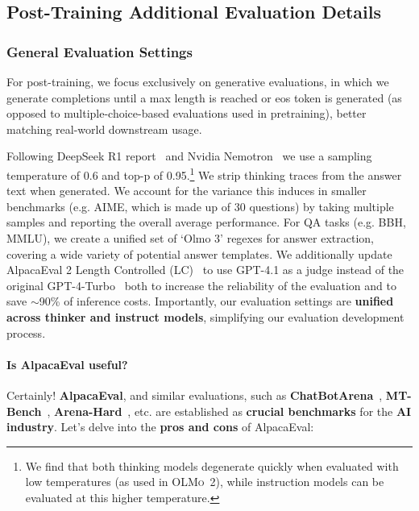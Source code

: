 \documentclass[table]{ai2style/ai2}
\newcommand{\oldOlmo}{OLMo\xspace}
\newcommand{\olmotoo}{\textsc{\oldOlmo~2}\xspace}
\begin{document}
{{\subsection{Post-Training Additional Evaluation Details}
\label{appx:eval-details}
\subsubsection{General Evaluation Settings}
\label{appx:eval-fun}

For post-training, we focus exclusively on generative evaluations, in which we generate completions until a max length is reached or eos token is generated (as opposed to multiple-choice-based evaluations used in pretraining), better matching real-world downstream usage.

Following DeepSeek R1 report~\citep{guo2025deepseek} and Nvidia Nemotron~\citep{adler2024nemotron} we use a sampling temperature of 0.6 and top-p of 0.95.\footnote{We find that both thinking models degenerate quickly when evaluated with low temperatures (as used in \olmotoo), while instruction models can be evaluated at this higher temperature.} We strip thinking traces from the answer text when generated.
We account for the variance this induces in smaller benchmarks (e.g. AIME, which is made up of 30 questions) by taking multiple samples and reporting the overall average performance.
For QA tasks (e.g. BBH, MMLU), we create a unified set of `Olmo 3' regexes for answer extraction, covering a wide variety of potential answer templates.
We additionally update AlpacaEval 2 Length Controlled (LC)~\citep{dubois2024length} to use GPT-4.1 as a judge instead of the original GPT-4-Turbo~\citep{gpt4} both to increase the reliability of the evaluation and to save $\sim$90\% of inference costs.
Importantly, our evaluation settings are {\bf unified across thinker and instruct models}, simplifying our evaluation development process.

\paragraph{Is AlpacaEval useful?}
Certainly! {\bf{AlpacaEval}}, and similar evaluations, such as {\bf{ChatBotArena}}~\citep{zheng2023judging}, {\bf{MT-Bench}}~\citep{zheng2023judging}, {\bf{Arena-Hard}}~\citep{li2024crowdsourced}, etc. are established as {\bf{crucial benchmarks}} for the {\bf{AI industry}}.
Let's delve into the {\bf{pros and cons}} of AlpacaEval:

}}
\end{document}

